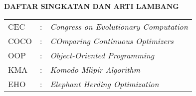\clearpage
{}
{}

\begin{center}
    \large \textbf{DAFTAR SINGKATAN DAN ARTI LAMBANG}
\end{center}
\vspace{3em}

\begin{center}
    \begin{table}[htbp]
        \begin{tabular}{l l l}
            CEC            &:& \textit{Congress on Evolutionary Computation} \\ %
            COCO            &:& \textit{COmparing Continuous Optimizers} \\ %
            OOP            &:& \textit{Object-Oriented Programming} \\ %
            KMA            &:& \textit{Komodo Mlipir Algorithm} \\ %
            EHO            &:& \textit{Elephant Herding Optimization} \\ %
        \end{tabular}
    \end{table}
\end{center}


